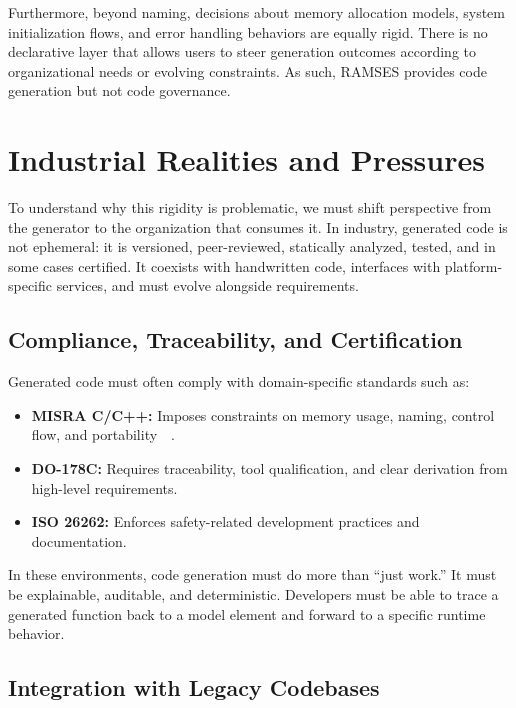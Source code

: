 Furthermore, beyond naming, decisions about memory allocation models, system initialization flows, and error handling behaviors are equally rigid. There is no declarative layer that allows users to steer generation outcomes according to organizational needs or evolving constraints. As such, RAMSES provides code generation but not code governance.

\section{Industrial Realities and Pressures}
\label{sec:industrial_realities}

To understand why this rigidity is problematic, we must shift perspective from the generator to the organization that consumes it. In industry, generated code is not ephemeral: it is versioned, peer-reviewed, statically analyzed, tested, and in some cases certified. It coexists with handwritten code, interfaces with platform-specific services, and must evolve alongside requirements.

\subsection*{Compliance, Traceability, and Certification}

Generated code must often comply with domain-specific standards such as:

\begin{itemize}
	\item \textbf{MISRA C/C++:} Imposes constraints on memory usage, naming, control flow, and portability~\cite{Misra_C_2025}~\cite{Misra_Cpp_2023}.
	\item \textbf{DO-178C:} Requires traceability, tool qualification, and clear derivation from high-level requirements.
	\item \textbf{ISO 26262:} Enforces safety-related development practices and documentation.
\end{itemize}

In these environments, code generation must do more than “just work.” It must be explainable, auditable, and deterministic. Developers must be able to trace a generated function back to a model element and forward to a specific runtime behavior.

\subsection*{Integration with Legacy Codebases}


